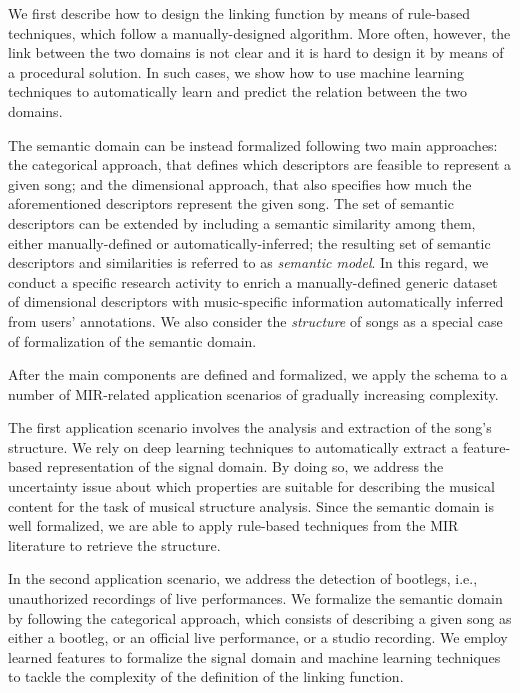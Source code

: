 We first describe how to design the linking function by means of rule-based techniques, which follow a manually-designed algorithm. More often, however, the link between the two domains is not clear and it is hard to design it by means of a procedural solution. In such cases, we show how to use machine learning techniques to automatically learn and predict the relation between the two domains.

The semantic domain can be instead formalized following two main approaches: the categorical approach, that defines which descriptors are feasible to represent a given song; and the dimensional approach, that also specifies how much the aforementioned descriptors represent the given song. The set of semantic descriptors can be extended by including a semantic similarity among them, either manually-defined or automatically-inferred; the resulting set of semantic descriptors and similarities is referred to as \textit{semantic model}.  In this regard, we conduct a specific research activity to enrich a manually-defined generic dataset of dimensional descriptors with music-specific information automatically inferred from users' annotations. We also consider the \textit{structure} of songs as a special case of formalization of the semantic domain. 

After the main components are defined and formalized, we apply the schema to a number of MIR-related application scenarios of gradually increasing complexity. 

The first application scenario involves the analysis and extraction of the song's structure. We rely on deep learning techniques to automatically extract a feature-based representation of the signal domain. By doing so, we address the uncertainty issue about which properties are suitable for describing the musical content for the task of musical structure analysis. Since the semantic domain is well formalized, we are able to apply rule-based techniques from the MIR literature to retrieve the structure.

In the second application scenario, we address the detection of bootlegs, i.e., unauthorized recordings of live performances. We formalize the semantic domain by following the categorical approach, which consists of describing a given song as either a bootleg, or an official live performance, or a studio recording. We employ learned features to formalize the signal domain and machine learning techniques to tackle the complexity of the definition of the linking function.

